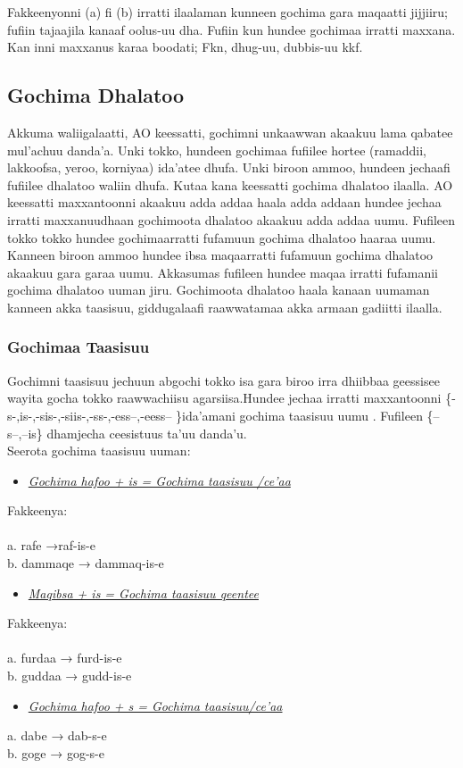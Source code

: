 \documentclass[11pt,b5paper]{book}
\begin{document}
Fakkeenyonni (a) fi (b) irratti ilaalaman kunneen gochima gara maqaatti jijjiiru; fufiin tajaajila kanaaf oolus-uu dha. Fufiin kun hundee gochimaa irratti maxxana. Kan inni maxxanus karaa boodati; Fkn, dhug-uu, dubbis-uu kkf.

\subsection{Gochima Dhalatoo}
Akkuma waliigalaatti, AO keessatti, gochimni unkaawwan akaakuu lama qabatee mul’achuu danda'a. Unki tokko, hundeen
gochimaa fufiilee hortee (ramaddii, lakkoofsa, yeroo, korniyaa) ida’atee dhufa. Unki biroon ammoo, hundeen jechaafi fufiilee dhalatoo waliin dhufa. Kutaa kana keessatti gochima dhalatoo ilaalla. AO keessatti maxxantoonni akaakuu adda addaa haala adda addaan hundee jechaa irratti maxxanuudhaan gochimoota dhalatoo akaakuu adda addaa uumu. Fufileen tokko tokko hundee gochimaarratti fufamuun gochima dhalatoo haaraa uumu. Kanneen biroon ammoo hundee ibsa maqaarratti fufamuun gochima dhalatoo akaakuu gara garaa uumu. Akkasumas fufileen hundee maqaa irratti fufamanii gochima dhalatoo uuman jiru. Gochimoota dhalatoo haala kanaan uumaman kanneen akka taasisuu, giddugalaafi raawwatamaa akka armaan gadiitti ilaalla. 

\subsubsection{Gochimaa Taasisuu}
Gochimni taasisuu jechuun abgochi tokko isa gara biroo irra dhiibbaa geessisee wayita gocha tokko raawwachiisu agarsiisa.Hundee jechaa irratti maxxantoonni \{-s-,is-,-sis-,-siis-,-ss-,-ess–,-eess– \}ida’amani gochima taasisuu uumu \cite[p.100]{tolemariam2009}. Fufileen \{–s–,–is\} dhamjecha ceesistuus ta’uu danda’u.\\

Seerota gochima taasisuu uuman:
\begin{itemize}
	\item \textit{\underline{Gochima hafoo + is = Gochima taasisuu /ce’aa }}
\end{itemize}
Fakkeenya:\\
\\
a. rafe →raf-is-e\\
b. dammaqe → dammaq-is-e\\
\begin{itemize}
	\item \textit{\underline{Maqibsa + is = Gochima taasisuu qeentee }}
\end{itemize}
Fakkeenya:\\
\\
a. furdaa → furd-is-e \\
b. guddaa → gudd-is-e \\
\begin{itemize}
	\item \textit{\underline{Gochima hafoo + s = Gochima taasisuu/ce’aa }}
\end{itemize}
a. dabe → dab-s-e \\
b. goge → gog-s-e \\
\end{document}
